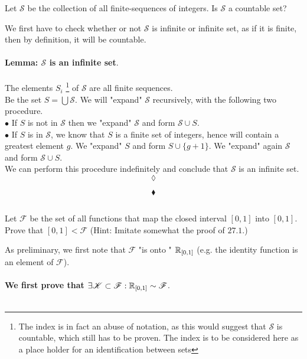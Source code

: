 \subsubsection{}
\begin{tcolorbox}
Let $\mathscr{S}$ be the collection of all finite-sequences of integers. Is $\mathscr{S}$ a countable set? 
\end{tcolorbox}
We first have to check whether or not $\mathscr{S}$ is infinite or infinite set, as if it is finite, then by definition, it will be countable.\\\\
\textbf{Lemma: $\mathscr{S}$ is an infinite set}.\\\\
The elements $S_i$  \footnote{The index is in fact an abuse of notation, as this would suggest that $\mathscr{S}$ is countable, which still has to be proven. The index is to be considered here as a place holder for an identification between sets}   of $\mathscr{S}$ are all finite sequences. \\
Be the set $S=\bigcup\mathscr{S}$. We will "expand" $\mathscr{S}$ recursively, with the following two procedure.\\
$\bullet$ If $S$ is not in $\mathscr{S}$ then we "expand" $\mathscr{S}$ and form $\mathscr{S}\cup S$. \\
$\bullet$ If $S$ is  in $\mathscr{S}$, we know that $S$ is a finite set of integers, hence will contain a greatest element $g$. We "expand" $S$ and form $S\cup \{g+1\}$. We "expand" again $\mathscr{S}$ and form $\mathscr{S}\cup S$.\\
We can perform this procedure indefinitely and conclude that $\mathscr{S}$ is an infinite set.
$$\lozenge$$

$$\blacklozenge$$


\renewcommand{\thesubsection}{\thesection.\RomanNumeralCaps{12}}
\subsection{}
\begin{tcolorbox}
Let $\mathscr{F}$ be the set of all functions that map the closed interval $[0, 1]$ into $[0, 1]$. Prove that $[0,1] < \mathscr{F}$ (Hint: Imitate somewhat the proof of $\mathbf{27.1}$.) 
\end{tcolorbox}
As preliminary, we first note that $\mathscr{F}$ "is onto " $\mathbb{R}_{[0,1]}$ (e.g. the identity function is an element of $\mathscr{F}$).\\\\
\textbf{We first prove that $\exists \mathscr{K}\subset \mathscr{F}:\mathbb{R}_{[0,1]}\sim\mathscr{F}$}.\\\\


